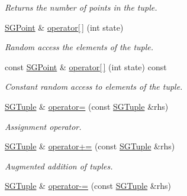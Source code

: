 \begin{DoxyCompactItemize}
\begin{DoxyCompactList}\small\item\em Returns the number of points in the tuple. \end{DoxyCompactList}\item 
\hypertarget{classSGTuple_afdc495d4532e5935f37e34b29e688867}{\hyperlink{classSGPoint}{S\-G\-Point} \& \hyperlink{classSGTuple_afdc495d4532e5935f37e34b29e688867}{operator\mbox{[}$\,$\mbox{]}} (int state)}\label{classSGTuple_afdc495d4532e5935f37e34b29e688867}

\begin{DoxyCompactList}\small\item\em Random access the elements of the tuple. \end{DoxyCompactList}\item 
\hypertarget{classSGTuple_a93d85ccd16400b44a892d330f8b32d45}{const \hyperlink{classSGPoint}{S\-G\-Point} \& \hyperlink{classSGTuple_a93d85ccd16400b44a892d330f8b32d45}{operator\mbox{[}$\,$\mbox{]}} (int state) const }\label{classSGTuple_a93d85ccd16400b44a892d330f8b32d45}

\begin{DoxyCompactList}\small\item\em Constant random access to elements of the tuple. \end{DoxyCompactList}\item 
\hypertarget{classSGTuple_a1274463fbd40d837c0167252555156e0}{\hyperlink{classSGTuple}{S\-G\-Tuple} \& \hyperlink{classSGTuple_a1274463fbd40d837c0167252555156e0}{operator=} (const \hyperlink{classSGTuple}{S\-G\-Tuple} \&rhs)}\label{classSGTuple_a1274463fbd40d837c0167252555156e0}

\begin{DoxyCompactList}\small\item\em Assignment operator. \end{DoxyCompactList}\item 
\hypertarget{classSGTuple_acf8c7d73d8f2704979ca44b0c755ecc7}{\hyperlink{classSGTuple}{S\-G\-Tuple} \& \hyperlink{classSGTuple_acf8c7d73d8f2704979ca44b0c755ecc7}{operator+=} (const \hyperlink{classSGTuple}{S\-G\-Tuple} \&rhs)}\label{classSGTuple_acf8c7d73d8f2704979ca44b0c755ecc7}

\begin{DoxyCompactList}\small\item\em Augmented addition of tuples. \end{DoxyCompactList}\item 
\hypertarget{classSGTuple_ae3c5e1bb4faf5fb652cdb8440133d2de}{\hyperlink{classSGTuple}{S\-G\-Tuple} \& \hyperlink{classSGTuple_ae3c5e1bb4faf5fb652cdb8440133d2de}{operator-\/=} (const \hyperlink{classSGTuple}{S\-G\-Tuple} \&rhs)}\label{classSGTuple_ae3c5e1bb4faf5fb652cdb8440133d2de}


\end{DoxyCompactItemize}
